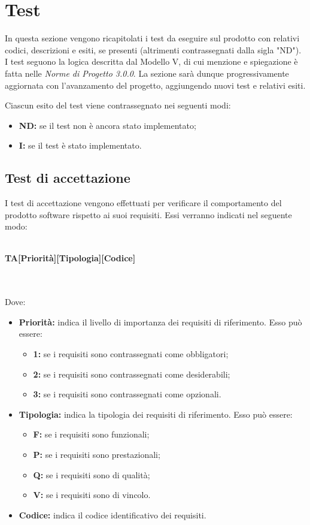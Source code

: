 \section{Test}
In questa sezione vengono ricapitolati i test da eseguire sul prodotto con relativi codici, descrizioni e esiti, se presenti (altrimenti contrassegnati dalla sigla "ND"). I test seguono la logica descritta dal Modello V, di cui menzione e spiegazione è fatta nelle \textit{Norme di Progetto 3.0.0\docs}. La sezione sarà dunque progressivamente aggiornata con l'avanzamento del progetto, aggiungendo nuovi test e relativi esiti.

Ciascun esito del test viene contrassegnato nei seguenti modi:
\begin{itemize}
	\item \textbf{ND:} se il test non è ancora stato implementato;
	\item \textbf{I:} se il test è stato implementato.
\end{itemize}

\subsection{Test di accettazione}
I test di accettazione vengono effettuati per verificare il comportamento del prodotto software rispetto ai suoi requisiti. Essi verranno indicati nel seguente modo:\\\\
\centerline{\textbf{TA[Priorità][Tipologia][Codice]}}\\\\
Dove:
\begin{itemize}
	\item \textbf{Priorità:} indica il livello di importanza dei requisiti di riferimento. Esso può essere:
	\begin{itemize}
		\item \textbf{1:} se i requisiti sono contrassegnati come obbligatori;
		\item \textbf{2:} se i requisiti sono contrassegnati come desiderabili;
		\item \textbf{3:} se i requisiti sono contrassegnati come opzionali.
	\end{itemize}
	\item \textbf{Tipologia:} indica la tipologia dei requisiti di riferimento. Esso può essere:
	\begin{itemize}
		\item \textbf{F:} se i requisiti sono funzionali;
		\item \textbf{P:} se i requisiti sono prestazionali;
		\item \textbf{Q:} se i requisiti sono di qualità;
		\item \textbf{V:} se i requisiti sono di vincolo.
	\end{itemize}
	\item \textbf{Codice:} indica il codice identificativo dei requisiti.
\end{itemize}

